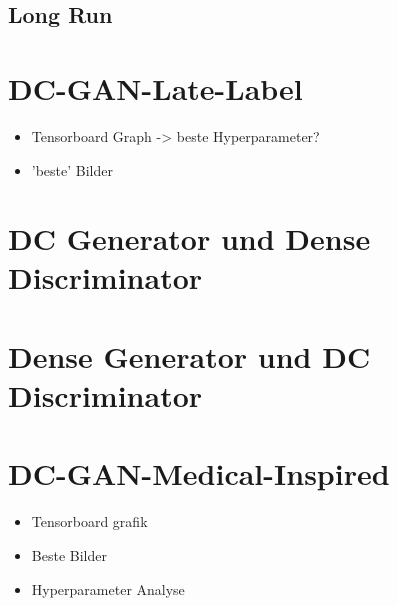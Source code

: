 \subsection{Long Run}

\section{DC-GAN-Late-Label}
\begin{itemize}
	\item Tensorboard Graph -> beste Hyperparameter?
	\item 'beste' Bilder
\end{itemize}

\section{DC Generator und Dense Discriminator}

\section{Dense Generator und DC Discriminator}

\section{DC-GAN-Medical-Inspired}
\begin{itemize}
	\item Tensorboard grafik
	\item Beste Bilder
	\item Hyperparameter Analyse
\end{itemize}
